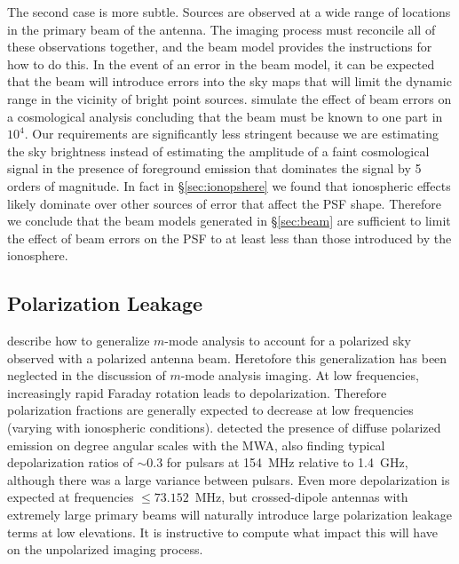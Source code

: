 \documentclass[twocolumn]{aastex61}
\begin{document}
The second case is more subtle. Sources are observed at a wide range of locations in the primary
beam of the antenna. The imaging process must reconcile all of these observations together, and the
beam model provides the instructions for how to do this. In the event of an error in the beam model,
it can be expected that the beam will introduce errors into the sky maps that will limit the dynamic
range in the vicinity of bright point sources.  \citet{2015PhRvD..91h3514S} simulate the effect of
beam errors on a cosmological analysis concluding that the beam must be known to one part in $10^4$.
Our requirements are significantly less stringent because we are estimating the sky brightness
instead of estimating the amplitude of a faint cosmological signal in the presence of foreground
emission that dominates the signal by 5 orders of magnitude. In fact in \S\ref{sec:ionopshere} we
found that ionospheric effects likely dominate over other sources of error that affect the PSF
shape. Therefore we conclude that the beam models generated in \S\ref{sec:beam} are sufficient to
limit the effect of beam errors on the PSF to at least less than those introduced by the ionosphere.

\subsection{Polarization Leakage}

\citet{2015PhRvD..91h3514S} describe how to generalize $m$-mode analysis to account for a polarized
sky observed with a polarized antenna beam. Heretofore this generalization has been neglected in the
discussion of $m$-mode analysis imaging.  At low frequencies, increasingly rapid Faraday rotation
leads to depolarization. Therefore polarization fractions are generally expected to decrease at low
frequencies (varying with ionospheric conditions). \citet{2016ApJ...830...38L} detected the presence
of diffuse polarized emission on degree angular scales with the MWA, also finding typical
depolarization ratios of $\sim0.3$ for pulsars at 154~MHz relative to 1.4~GHz, although there was a
large variance between pulsars. Even more depolarization is expected at frequencies $\le
73.152$~MHz, but crossed-dipole antennas with extremely large primary beams will naturally introduce
large polarization leakage terms at low elevations.  It is instructive to compute what impact this
will have on the unpolarized imaging process.
\end{document}
